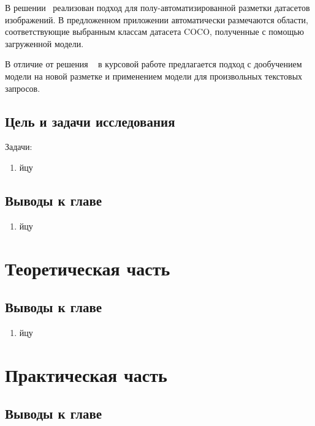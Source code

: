\documentclass[a4paper,14pt]{article}
\begin{document}
	В решении~\cite{AnnoMage} реализован подход для полу-автоматизированной разметки датасетов изображений. В предложенном приложении автоматически размечаются области, соответствующие выбранным классам датасета COCO, полученные с помощью загруженной модели.
	
	В отличие от решения ~\cite{AnnoMage} в курсовой работе предлагается подход с дообучением модели на новой разметке и применением модели для произвольных текстовых запросов.
	
    \subsection{Цель и задачи исследования}

    Задачи:
    \begin{enumerate}
        [1)]
        \itemsep0em
        \item йцу

    \end{enumerate}

    \subsection{Выводы к главе \thesection}
    \begin{enumerate}
        [1)]
        \itemsep0em
        \item йцу
    \end{enumerate}

    \newpage


    \section{Теоретическая часть}

    \subsection{Выводы к главе \thesection}
    \begin{enumerate}
        [1)]
        \itemsep0em
        \item йцу
    \end{enumerate}

    \newpage


    \section{Практическая часть}

    \subsection{Выводы к главе \thesection}
\end{document}
